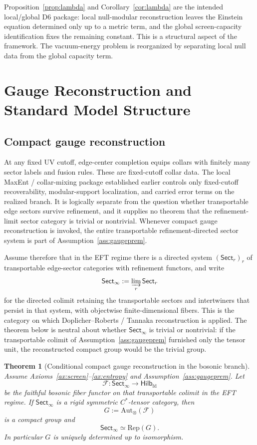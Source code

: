 \documentclass[11pt]{article}
\newtheorem{theorem}{Theorem}[section]
\begin{document}
Proposition~\ref{prop:lambda} and Corollary~\ref{cor:lambda} are the intended local/global D6 package: local null-modular reconstruction leaves the Einstein equation determined only up to a metric term, and the global screen-capacity identification fixes the remaining constant. This is a structural aspect of the framework. The vacuum-energy problem is reorganized by separating local null data from the global capacity term.

\section{Gauge Reconstruction and Standard Model Structure}

\subsection{Compact gauge reconstruction}

At any fixed UV cutoff, edge-center completion equips collars with finitely many sector labels and fusion rules. These are fixed-cutoff collar data. The local MaxEnt / collar-mixing package established earlier controls only fixed-cutoff recoverability, modular-support localization, and carried error terms on the realized branch. It is logically separate from the question whether transportable edge sectors survive refinement, and it supplies no theorem that the refinement-limit sector category is trivial or nontrivial. Whenever compact gauge reconstruction is invoked, the entire transportable refinement-directed sector system is part of Assumption~\ref{ass:gaugeprem}.

Assume therefore that in the EFT regime there is a directed system \((\mathsf{Sect}_r)_r\) of transportable edge-sector categories with refinement functors, and write
\[
\mathsf{Sect}_\infty := \varinjlim_r \mathsf{Sect}_r
\]
for the directed colimit retaining the transportable sectors and intertwiners that persist in that system, with objectwise finite-dimensional fibers. This is the category on which Doplicher--Roberts / Tannaka reconstruction is applied. The theorem below is neutral about whether \(\mathsf{Sect}_\infty\) is trivial or nontrivial: if the transportable colimit of Assumption~\ref{ass:gaugeprem} furnished only the tensor unit, the reconstructed compact group would be the trivial group.

\begin{theorem}[Conditional compact gauge reconstruction in the bosonic branch]\label{thm:compactgauge}
Assume Axioms~\ref{ax:screen}--\ref{ax:entropy} and Assumption~\ref{ass:gaugeprem}. Let
\[
\mathcal F:\mathsf{Sect}_\infty\to\mathsf{Hilb}_{\mathrm{fd}}
\]
be the faithful bosonic fiber functor on that transportable colimit in the EFT regime. If \(\mathsf{Sect}_\infty\) is a rigid symmetric \(C^*\)-tensor category, then
\[
G:=\mathrm{Aut}_\otimes(\mathcal F)
\]
is a compact group and
\[
\mathsf{Sect}_\infty\simeq \mathrm{Rep}(G).
\]
In particular \(G\) is uniquely determined up to isomorphism.
\end{theorem}
\end{document}
